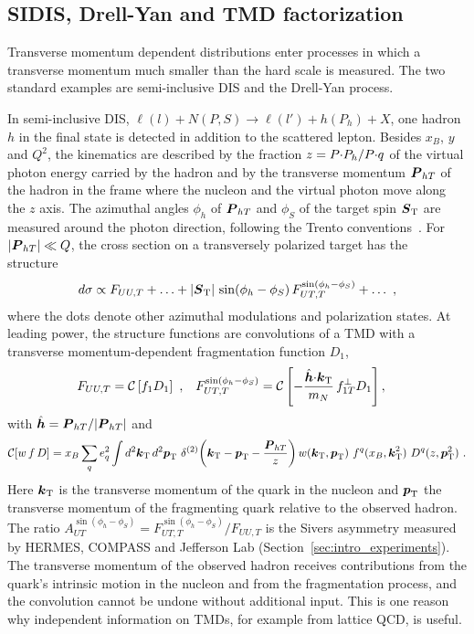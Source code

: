 \subsection{SIDIS, Drell-Yan and TMD factorization}
\label{sec:sidis_dy}

Transverse momentum dependent distributions enter processes in which a transverse momentum much smaller than the hard scale is measured. The two standard examples are semi-inclusive DIS and the Drell-Yan process.

In semi-inclusive DIS, $\ell(l) + N(P,S) \to \ell(l') + h(P_h) + X$, one hadron $h$ in the final state is detected in addition to the scattered lepton. Besides $x_B$, $y$ and $Q^2$, the kinematics are described by the fraction $z = P{\cdot} P_h/P{\cdot} q$ of the virtual photon energy carried by the hadron and by the transverse momentum $\boldsymbol{P}_{hT}$ of the hadron in the frame where the nucleon and the virtual photon move along the $z$ axis. The azimuthal angles $\phi_h$ of $\boldsymbol{P}_{hT}$ and $\phi_S$ of the target spin $\boldsymbol{S}_{\mathrm T}$ are measured around the photon direction, following the Trento conventions~\cite{Bacchetta:2004jz}. For $|\boldsymbol{P}_{hT}| \ll Q$, the cross section on a transversely polarized target has the structure~\cite{Bacchetta:2006tn}
\begin{equation}
  d\sigma \propto F_{UU,T} + \ldots + |\boldsymbol{S}_{\mathrm T}|\,\sin(\phi_h - \phi_S)\,F_{UT,T}^{\sin(\phi_h-\phi_S)} + \ldots \ ,
\end{equation}
where the dots denote other azimuthal modulations and polarization states. At leading power, the structure functions are convolutions of a TMD with a transverse momentum-dependent fragmentation function $D_1$,
\begin{align}
  F_{UU,T} &= \mathcal{C}\left[f_1 D_1\right] \ , &
  F_{UT,T}^{\sin(\phi_h-\phi_S)} &= \mathcal{C}\left[-\frac{\hat{\boldsymbol{h}}{\cdot}\boldsymbol{k}_{\mathrm T}}{m_N}\,f_{1T}^\perp D_1\right] ,
  \label{eq:sidis_structure_functions}
\end{align}
with $\hat{\boldsymbol{h}} = \boldsymbol{P}_{hT}/|\boldsymbol{P}_{hT}|$ and
\begin{equation}
  \mathcal{C}[w\,f\,D] = x_B\sum_q e_q^2\int d^2\vprp{k}\,d^2\vprp{p}\ \delta^{(2)}\!\left(\vprp{k} - \vprp{p} - \frac{\vect{P}_{hT}}{z}\right) w(\vprp{k},\vprp{p})\ f^q(x_B,\vprp{k}^2)\ D^q(z,\vprp{p}^2) \ .
\end{equation}
Here $\boldsymbol{k}_{\mathrm T}$ is the transverse momentum of the quark in the nucleon and $\boldsymbol{p}_{\mathrm T}$ the transverse momentum of the fragmenting quark relative to the observed hadron. The ratio $A_{UT}^{\sin(\phi_h-\phi_S)} = F_{UT,T}^{\sin(\phi_h-\phi_S)}/F_{UU,T}$ is the Sivers asymmetry measured by HERMES, COMPASS and Jefferson Lab (Section~\ref{sec:intro_experiments}). The transverse momentum of the observed hadron receives contributions from the quark's intrinsic motion in the nucleon and from the fragmentation process, and the convolution cannot be undone without additional input. This is one reason why independent information on TMDs, for example from lattice QCD, is useful.

